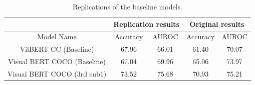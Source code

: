 \documentclass[10pt,twocolumn,letterpaper]{article}
\begin{document}
\begin{table}
\begin{center}
\begin{tabular}{c|c|c|c|c}
\hline
& \multicolumn{2}{c}{Replication results} & \multicolumn{2}{c}{Original results} \\
\hline\hline
Model Name & Accuracy & AUROC & Accuracy & AUROC \\ \hline
VilBERT CC (Baseline) & 67.96 & 66.01 & 61.40 & 70.07 \\ \hline
Visual BERT COCO (Baseline) & 67.04 & 69.96 & 65.06 & 73.97 \\ \hline
Visual BERT COCO (3rd sub1) & 73.52 & 75.68 & 70.93 & 75.21 \\ \hline
\end{tabular}
\end{center}
\caption{Replications of the baseline models.}
\label{tab:replication}
\end{table}
\end{document}
